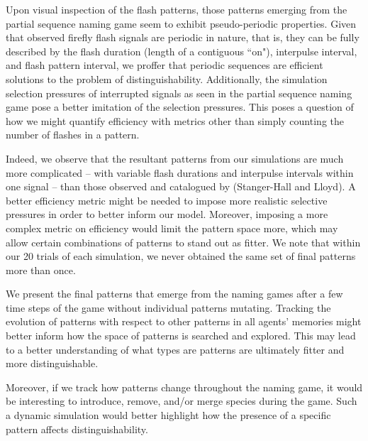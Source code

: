 
Upon visual inspection of the flash patterns, those patterns emerging from the partial sequence naming game seem to exhibit pseudo-periodic properties. 
Given that observed firefly flash signals are periodic in nature, that is, they can be fully described by the flash duration (length of a contiguous ``on"), interpulse interval, and flash pattern interval, we proffer that periodic sequences are efficient solutions to the problem of distinguishability.
Additionally, the simulation selection pressures of interrupted signals as seen in the partial sequence naming game pose a better imitation of the selection pressures. 
This poses a question of how we might quantify efficiency with metrics other than simply counting the number of flashes in a pattern. 

Indeed, we observe that the resultant patterns from our simulations are much more complicated -- with variable flash durations and interpulse intervals within one signal -- than those observed and catalogued by (Stanger-Hall and Lloyd). 
A better efficiency metric might be needed to impose more realistic selective pressures in order to better inform our model.
Moreover, imposing a more complex metric on efficiency would limit the pattern space more, which may allow certain combinations of patterns to stand out as fitter. 
We note that within our 20 trials of each simulation, we never obtained the same set of final patterns more than once.

We present the final patterns that emerge from the naming games after a few time steps of the game without individual patterns mutating. 
Tracking the evolution of patterns with respect to other patterns in all agents' memories might better inform how the space of patterns is searched and explored. 
This may lead to a better understanding of what types are patterns are ultimately fitter and more distinguishable. 

Moreover, if we track how patterns change throughout the naming game, it would be interesting to introduce, remove, and/or merge species during the game. 
Such a dynamic simulation would better highlight how the presence of a specific pattern affects distinguishability. 

 

